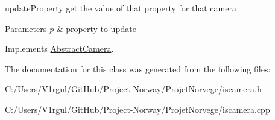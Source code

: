 update\-Property get the value of that property for that camera 


\begin{DoxyParams}{Parameters}
{\em p} & property to update \\
\hline
\end{DoxyParams}


Implements \hyperlink{class_abstract_camera_acb48ab701cd02e78604a3ca1c695b1cf}{Abstract\-Camera}.



The documentation for this class was generated from the following files\-:\begin{DoxyCompactItemize}
\item 
C\-:/\-Users/\-V1rgul/\-Git\-Hub/\-Project-\/\-Norway/\-Projet\-Norvege/iscamera.\-h\item 
C\-:/\-Users/\-V1rgul/\-Git\-Hub/\-Project-\/\-Norway/\-Projet\-Norvege/iscamera.\-cpp\end{DoxyCompactItemize}
